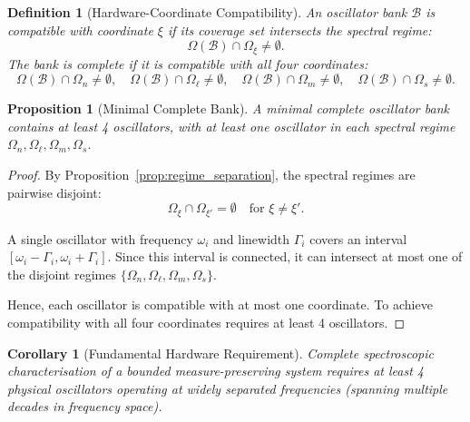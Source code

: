 \documentclass[twocolumn,10pt,a4paper]{article}
\newtheorem{corollary}[theorem]{Corollary}
\newtheorem{proposition}[theorem]{Proposition}
\newtheorem{definition}[theorem]{Definition}
\theoremstyle{remark}
\begin{document}
\begin{definition}[Hardware-Coordinate Compatibility]
\label{def:compatibility}
An oscillator bank $\mathcal{B}$ is \emph{compatible} with coordinate $\xi$ if its coverage set intersects the spectral regime:
\begin{equation}
\Omega(\mathcal{B}) \cap \Omega_\xi \neq \emptyset.
\end{equation}
The bank is \emph{complete} if it is compatible with all four coordinates:
\begin{equation}
\Omega(\mathcal{B}) \cap \Omega_n \neq \emptyset, \quad \Omega(\mathcal{B}) \cap \Omega_\ell \neq \emptyset, \quad \Omega(\mathcal{B}) \cap \Omega_m \neq \emptyset, \quad \Omega(\mathcal{B}) \cap \Omega_s \neq \emptyset.
\end{equation}
\end{definition}

\begin{proposition}[Minimal Complete Bank]
\label{prop:minimal_bank}
A minimal complete oscillator bank contains at least 4 oscillators, with at least one oscillator in each spectral regime $\Omega_n, \Omega_\ell, \Omega_m, \Omega_s$.
\end{proposition}

\begin{proof}
By Proposition~\ref{prop:regime_separation}, the spectral regimes are pairwise disjoint:
\begin{equation}
\Omega_\xi \cap \Omega_{\xi'} = \emptyset \quad \text{for } \xi \neq \xi'.
\end{equation}

A single oscillator with frequency $\omega_i$ and linewidth $\Gamma_i$ covers an interval $[\omega_i - \Gamma_i, \omega_i + \Gamma_i]$. Since this interval is connected, it can intersect at most one of the disjoint regimes $\{\Omega_n, \Omega_\ell, \Omega_m, \Omega_s\}$.

Hence, each oscillator is compatible with at most one coordinate. To achieve compatibility with all four coordinates requires at least 4 oscillators.
\end{proof}

\begin{corollary}[Fundamental Hardware Requirement]
\label{cor:fundamental_hardware}
Complete spectroscopic characterisation of a bounded measure-preserving system requires at least 4 physical oscillators operating at widely separated frequencies (spanning multiple decades in frequency space).
\end{corollary}
\end{document}
